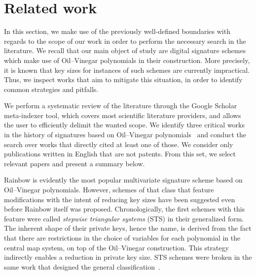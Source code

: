 \documentclass[draft, 12pt, a4paper, oneside]{memoir}
\begin{document}

\section{Related work}\label{sec:related}

In this section, we make use of the previously well-defined boundaries with regards to the scope of our work in order to perform the necessary search in the literature. We recall that our main object of study are digital signature schemes which make use of Oil--Vinegar polynomials in their construction. More precisely, it is known that key sizes for instances of such schemes are currently impractical. Thus, we inspect works that aim to mitigate this situation, in order to identify common strategies and pitfalls.

We perform a systematic review of the literature through the Google Scholar meta-indexer tool, which covers most scientific literature providers, and allows the user to efficiently delimit the wanted scope. We identify three critical works in the history of signatures based on Oil--Vinegar polynomials~\cite{Patarin:199709,Kipnis:199904,Ding:200506} and conduct the search over works that directly cited at least one of those. We consider only publications written in English that are not patents. From this set, we select relevant papers and present a summary below.


Rainbow is evidently the most popular multivariate signature scheme based on Oil--Vinegar polynomials. However, schemes of that class that feature modifications with the intent of reducing key sizes have been suggested even before Rainbow itself was proposed. Chronologically, the first schemes with this feature were called \emph{stepwise triangular systems} (STS) in their generalized form. The inherent shape of their private keys, hence the name, is derived from the fact that there are restrictions in the choice of variables for each polynomial in the central map system, on top of the Oil--Vinegar construction. This strategy indirectly enables a reduction in private key size. STS schemes were broken in the same work that designed the general classification~\cite{}.
\end{document}

